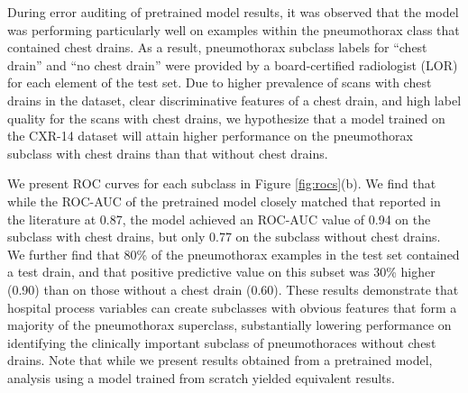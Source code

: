 \documentclass{article}
\begin{document}
During error auditing of pretrained model results, it was observed that the model was performing particularly well on examples within the pneumothorax class that contained chest drains. 
 As a result, pneumothorax subclass labels for ``chest drain'' and ``no chest drain'' were provided by a board-certified radiologist (LOR) for each element of the test set.  
 Due to higher prevalence of scans with chest drains in the dataset, clear discriminative features of a chest drain, and high label quality for the scans with chest drains, we hypothesize that a model trained on the CXR-14 dataset will attain higher performance on the pneumothorax subclass with chest drains than that without chest drains.  
 

We present ROC curves for each subclass in Figure \ref{fig:rocs}(b).  
We find that while the ROC-AUC of the pretrained model closely matched that reported in the literature at 0.87, the model achieved an ROC-AUC value of 0.94 on the subclass with chest drains, but only 0.77 on the subclass without chest drains.  
We further find that 80\% of the pneumothorax examples in the test set contained a test drain, and that positive predictive value on this subset was 30\% higher (0.90) than on those without a chest drain (0.60).  
 These results demonstrate that hospital process variables can create subclasses with obvious features that form a majority of the pneumothorax superclass, substantially lowering performance on identifying the clinically important subclass of pneumothoraces without chest drains.  
 Note that while we present results obtained from a pretrained model, analysis using a model trained from scratch yielded equivalent results. 
\end{document}
